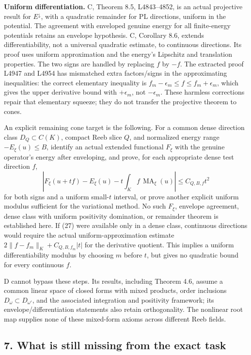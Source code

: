 \documentclass[
  11pt,
]{article}
\begin{document}
\textbf{Uniform differentiation.} C, Theorem 8.5, L4843--4852, is an
actual projective result for \(E^\downarrow\), with a quadratic
remainder for PL directions, uniform in the potential. The agreement
with enveloped genuine energy for all finite-energy potentials retains
an envelope hypothesis. C, Corollary 8.6, extends differentiability, not
a universal quadratic estimate, to continuous directions. Its proof uses
uniform approximation and the energy's Lipschitz and translation
properties. The two signs are handled by replacing \(f\) by \(-f\). The
extracted proof L4947 and L4954 has mismatched extra factors/signs in
the approximating inequalities: the correct elementary inequality is
\(f_m-\epsilon_m\leq f\leq f_m+\epsilon_m\), which gives the upper
derivative bound with \(+\epsilon_m\), not \(-\epsilon_m\). These
harmless corrections repair that elementary squeeze; they do not
transfer the projective theorem to cones.

An explicit remaining cone target is the following. For a common dense
direction class \(D_Q\subset C(K)\), compact Reeb slice \(Q\), and
normalized energy range \(-E_\xi(u)\leq B\), identify an actual extended
functional \(F_\xi\) with the genuine operator's energy after
enveloping, and prove, for each appropriate dense test direction \(f\),
\[
 |F_\xi(u+tf)-E_\xi(u)-t\int_K f\,\operatorname{MA}_\xi(u)|
 \leq C_{Q,B,f}t^2                                  \tag{27}
\] for both signs and a uniform small-\(t\) interval, or prove another
explicit uniform modulus sufficient for the variational method. No such
\(F_\xi\), envelope agreement, dense class with uniform positivity
domination, or remainder theorem is established here. If (27) were
available only in a dense class, continuous directions would require the
actual uniform-approximation estimate \(2\|f-f_m\|_K+ C_{Q,B,f_m}|t|\)
for the derivative quotient. This implies a uniform differentiability
modulus by choosing \(m\) before \(t\), but gives no quadratic bound for
every continuous \(f\).

D cannot bypass these steps. Its results, including Theorem 4.6, assume
a common linear space of closed forms with mixed products, order
inclusions \(D_\omega\subset D_{\omega'}\), and the associated
integration and positivity framework; its envelope/differentiation
statements also retain orthogonality. The nonlinear root map supplies
none of these mixed-form axioms across different Reeb fields.

\subsection{7. What is still missing from the exact
task}\label{what-is-still-missing-from-the-exact-task}
\end{document}
